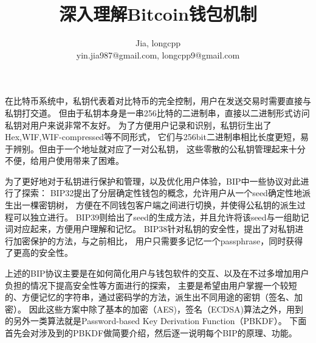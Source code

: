 \documentclass{article}
\begin{document}
\title{深入理解Bitcoin钱包机制}
\author{Jia, longcpp \\ \small{yin.jia987@gmail.com, longcpp9@gmail.com}}

\maketitle


在比特币系统中，私钥代表着对比特币的完全控制，用户在发送交易时需要直接与私钥打交道。
但由于私钥本身是一串256比特的二进制串，直接以二进制形式访问私钥对用户来说非常不友好。
为了方便用户记录和识别，私钥衍生出了Hex,WIF,WIF-compressed等不同形式，
它们与256bit二进制串相比长度更短，易于辨别。但由于一个地址就对应了一对公私钥，
这些零散的公私钥管理起来十分不便，给用户使用带来了困难。

为了更好地对于私钥进行保护和管理，以及优化用户体验，BIP中一些协议对此进行了探索：
BIP32提出了分层确定性钱包的概念，允许用户从一个seed确定性地派生出一棵密钥树，
方便在不同钱包客户端之间进行切换，并使得公私钥的派生过程可以独立进行。
BIP39则给出了seed的生成方法，并且允许将该seed与一组助记词对应起来，方便用户理解和记忆。
BIP38针对私钥的安全性，提出了对私钥进行加密保护的方法，与之前相比，
用户只需要多记忆一个passphrase，同时获得了更高的安全性。

上述的BIP协议主要是在如何简化用户与钱包软件的交互、以及在不过多增加用户负担的情况下提高安全性等方面进行的探索，
主要是希望由用户掌握一个较短的、方便记忆的字符串，通过密码学的方法，派生出不同用途的密钥（签名、加密）。
因此这些方案中除了基本的加密（AES)，签名（ECDSA)算法之外，用到的另外一类算法就是Password-based Key Derivation Function（PBKDF）。
下面首先会对涉及到的PBKDF做简要介绍，然后逐一说明每个BIP的原理、功能。








\end{document}
